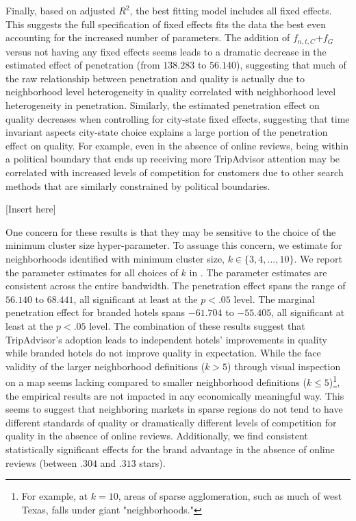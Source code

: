 \documentclass[mksc,blindrev]{informs3} %
\begin{document}
Finally, based on adjusted $R^2$, the best fitting model includes all fixed effects. This suggests the full specification of fixed effects fits the data the best even accounting for the increased number of parameters. The addition of $f_{n,t,C}$+$f_{G}$ versus not having any fixed effects seems leads to a dramatic decrease in the estimated effect of penetration (from $138.283$ to $56.140$), suggesting that much of the raw relationship between penetration and quality is actually due to neighborhood level heterogeneity in quality correlated with neighborhood level heterogeneity in penetration. Similarly, the estimated penetration effect on quality decreases when controlling for city-state fixed effects, suggesting that time invariant aspects city-state choice explains a large portion of the penetration effect on quality. For example, even in the absence of online reviews, being within a political boundary that ends up receiving more TripAdvisor attention may be correlated with increased levels of competition for customers due to other search methods that are similarly constrained by political boundaries.

[Insert  here]

One concern for these results is that they may be sensitive to the choice of the minimum cluster size hyper-parameter. To assuage this concern, we estimate  for neighborhoods identified with minimum cluster size, $k\in\{3,4,...,10\}$. We report the parameter estimates for all choices of $k$ in . The parameter estimates are consistent across the entire bandwidth. The penetration effect spans the range of $56.140$ to $68.441$, all significant at least at the $p<.05$ level. The marginal penetration effect for branded hotels spans $-61.704$ to $-55.405$, all significant at least at the $p<.05$ level. The combination of these results suggest that TripAdvisor's adoption leads to independent hotels' improvements in quality while branded hotels do not improve quality in expectation. While the face validity of the larger neighborhood definitions ($k>5$) through visual inspection on a map seems lacking compared to smaller neighborhood definitions ($k\le 5$)\footnote{For example, at $k=10$, areas of sparse agglomeration, such as much of west Texas, falls under giant "neighborhoods."}, the empirical results are not impacted in any economically meaningful way. This seems to suggest that neighboring markets in sparse regions do not tend to have different standards of quality or dramatically different levels of competition for quality in the absence of online reviews. Additionally, we find consistent statistically significant effects for the brand advantage in the absence of online reviews (between $.304$ and $.313$ stars). 
\end{document}

